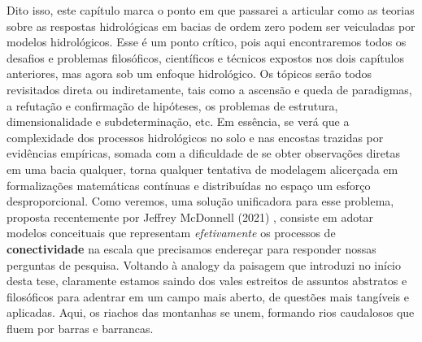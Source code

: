 \documentclass[./main.tex]{subfiles}
\begin{document}
\par Dito isso, este capítulo marca o ponto em que passarei a articular como as teorias sobre as respostas hidrológicas em bacias de ordem zero podem ser veiculadas por modelos hidrológicos. Esse é um ponto crítico, pois aqui encontraremos todos os desafios e problemas filosóficos, científicos e técnicos expostos nos dois capítulos anteriores, mas agora sob um enfoque hidrológico. Os tópicos serão todos revisitados direta ou indiretamente, tais como a ascensão e queda de paradigmas, a refutação e confirmação de hipóteses, os problemas de estrutura, dimensionalidade e subdeterminação, etc. Em essência, se verá que a complexidade dos processos hidrológicos no solo e nas encostas trazidas por evidências empíricas, somada com a dificuldade de se obter observações diretas em uma bacia qualquer, torna qualquer tentativa de modelagem alicerçada em formalizações matemáticas contínuas e distribuídas no espaço um esforço desproporcional. Como veremos, uma solução unificadora para esse problema, proposta recentemente por Jeffrey McDonnell (2021) \cite{mcdonnell2021}, consiste em adotar modelos conceituais que representam \textit{efetivamente} os processos de \textbf{conectividade} na escala que precisamos endereçar para responder nossas perguntas de pesquisa. Voltando à \gls{analogy} da paisagem que introduzi no início desta tese, claramente estamos saindo dos vales estreitos de assuntos abstratos e filosóficos para adentrar em um campo mais aberto, de questões mais tangíveis e aplicadas. Aqui, os riachos das montanhas se unem, formando rios caudalosos que fluem por barras e barrancas.
\end{document}
